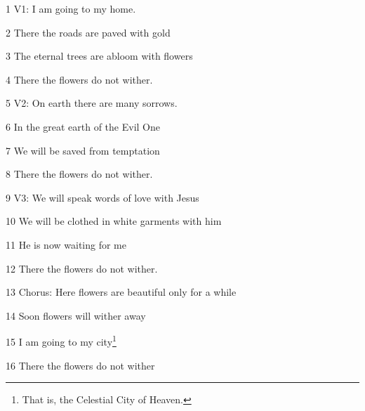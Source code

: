 
1 V1: I am going to my home.

2 There the roads are paved with gold

3 The eternal trees are abloom with flowers

4 There the flowers do not wither.

5 V2: On earth there are many sorrows.

6 In the great earth of the Evil One

7 We will be saved from temptation

8 There the flowers do not wither.

9 V3: We will speak words of love with Jesus

10 We will be clothed in white garments with him

11 He is now waiting for me

12 There the flowers do not wither.

13 Chorus: Here flowers are beautiful only for a while

14 Soon flowers will wither away

15 I am going to my city\footnote{That is, the Celestial City of Heaven.}

16 There the flowers do not wither

